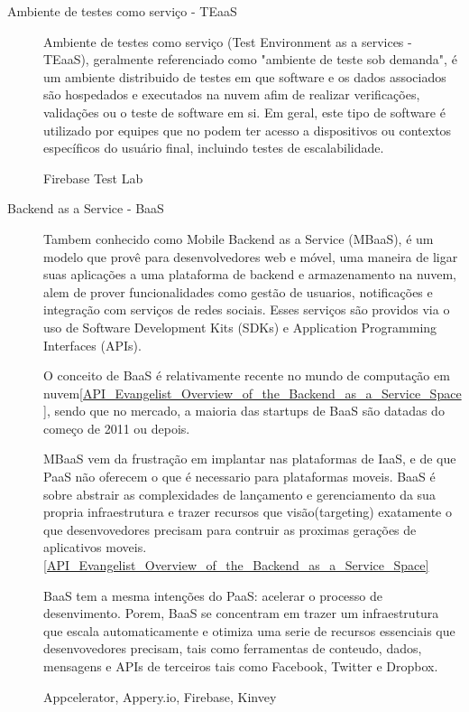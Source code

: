 \begin{description}
		\item[Ambiente de testes como serviço - TEaaS]
		Ambiente de testes como serviço (Test Environment as a services - TEaaS), geralmente referenciado como "ambiente de teste sob demanda", é um ambiente distribuido de testes em que software e os dados associados são hospedados e executados na nuvem afim de realizar verificações, validações ou o teste de software em si. Em geral, este tipo de software é utilizado por equipes que no podem ter acesso a dispositivos ou contextos específicos do usuário final, incluindo testes de escalabilidade.
	
		Firebase Test Lab

		\item[Backend as a Service - BaaS]
		Tambem conhecido como Mobile Backend as a Service (MBaaS), é um modelo que provê para desenvolvedores web e móvel, uma maneira de ligar suas aplicações a uma plataforma de backend e armazenamento na nuvem, alem de prover funcionalidades como gestão de usuarios, notificações e integração com serviços de redes sociais. Esses serviços são providos via o uso de Software Development Kits (SDKs) e Application Programming Interfaces (APIs). 
	
		O conceito de BaaS é relativamente recente no mundo de computação em nuvem\ref{API_Evangelist_Overview_of_the_Backend_as_a_Service_Space}, sendo que no mercado, a maioria das startups de BaaS são datadas do começo de 2011 ou depois.

		MBaaS vem da frustração em implantar nas plataformas de IaaS, e de que PaaS não oferecem o que é necessario para plataformas moveis. BaaS é sobre abstrair as complexidades de lançamento e gerenciamento da sua propria infraestrutura e trazer recursos que visão(targeting) exatamente o que desenvovedores precisam para contruir as proximas gerações de aplicativos moveis.\ref{API_Evangelist_Overview_of_the_Backend_as_a_Service_Space}

		BaaS tem a mesma intenções do PaaS: acelerar o processo de desenvimento. Porem, BaaS se concentram em trazer um infraestrutura que escala automaticamente e otimiza uma serie de recursos essenciais que desenvovedores precisam, tais como ferramentas de conteudo, dados, mensagens e APIs de terceiros tais como Facebook, Twitter e Dropbox.


		Appcelerator, Appery.io, Firebase, Kinvey

		\end{description}

